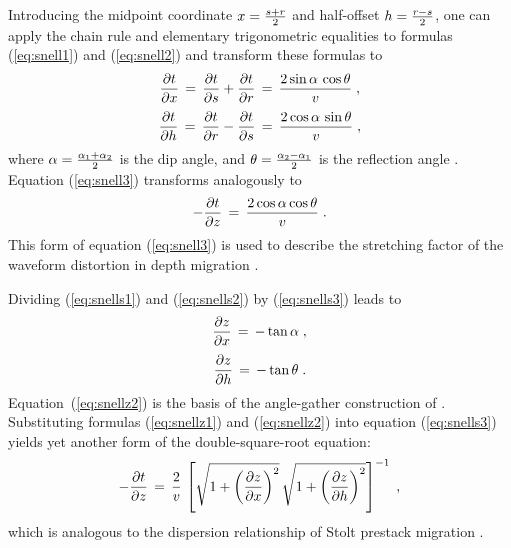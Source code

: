 Introducing the midpoint coordinate $x = {{s+ r} \over 2}$ and half-offset
$h = {{r - s} \over 2}$, one can apply the chain rule and elementary
trigonometric equalities to formulas (\ref{eq:snell1}) and
(\ref{eq:snell2}) and transform these formulas to 
\begin{equation}
{{\partial t} \over {\partial x}} \,=\, 
{{\partial t} \over {\partial s}} + 
{{\partial t} \over {\partial r}} \,=\, 
{ {2 \sin{\alpha}\,\cos{\theta}} \over {v}}\;,
\label{eq:snells1}
\end{equation}
\begin{equation}
{{\partial t} \over {\partial h}} \,=\,
{{\partial t} \over {\partial r}} - 
{{\partial t} \over {\partial s}} \,=\, 
{ {2 \cos{\alpha}\,\sin{\theta}} \over {v}} \;,
\label{eq:snells2}
\end{equation}
where $\alpha = {{\alpha_1 + \alpha_2} \over 2}$ is the dip angle, and
$\theta = {{\alpha_2 - \alpha_1} \over 2}$ is the reflection angle
\cite[]{Clayton.sep.14.21,Claerbout.blackwell.85}. Equation
(\ref{eq:snell3}) transforms analogously to
\begin{equation}
- {{\partial t} \over {\partial z}} \,=\,
{{2 \cos{\alpha} \cos{\theta}} \over {v}}\;. 
\label{eq:snells3}
\end{equation}
This form of equation (\ref{eq:snell3}) is used to describe the stretching
factor of the waveform distortion in depth migration \cite[]{Tygel}.

Dividing (\ref{eq:snells1}) and (\ref{eq:snells2}) by
(\ref{eq:snells3}) leads to
\begin{equation}
{{\partial z} \over {\partial x}} \,=\,
- \tan{\alpha}\;, 
\label{eq:snellz1}
\end{equation}
\begin{equation}
{{\partial z} \over {\partial h}} \,=\,
- \tan{\theta}\;.
\label{eq:snellz2}
\end{equation}
Equation~(\ref{eq:snellz2}) is the basis of the angle-gather construction of
\cite{sandf}.
Substituting formulas (\ref{eq:snellz1}) and (\ref{eq:snellz2}) into equation
(\ref{eq:snells3}) yields yet another form of the double-square-root equation:
\begin{equation}
- {{\partial t} \over {\partial z}} \,=\, {2 \over {v}}\,
\left[\sqrt{1 + \left({\partial z} \over {\partial x}\right)^2}\,
\sqrt{1 + \left({\partial z} \over {\partial h}\right)^2}\right]^{-1}\;, 
\label{eq:snellz3}
\end{equation}
which is analogous to the dispersion relationship of Stolt prestack
migration \cite[]{GEO43-01-00230048}.
 
